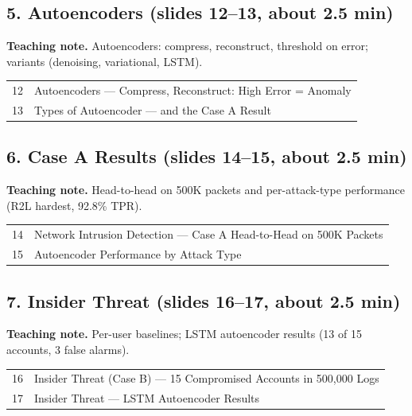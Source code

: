 \documentclass[11pt]{article}
\begin{document}
\subsection{5. Autoencoders \normalfont\small\color{GreyN}(slides 12--13, about 2.5 min)}

\textbf{Teaching note.} Autoencoders: compress, reconstruct, threshold on error; variants (denoising, variational, LSTM).

\begin{center}\small\renewcommand{\arraystretch}{1.1}\begin{tabularx}{\textwidth}{@{}r X@{}}12 & Autoencoders --- Compress, Reconstruct: High Error = Anomaly\\
13 & Types of Autoencoder --- and the Case A Result\\\end{tabularx}\end{center}

\subsection{6. Case A Results \normalfont\small\color{GreyN}(slides 14--15, about 2.5 min)}

\textbf{Teaching note.} Head-to-head on 500K packets and per-attack-type performance (R2L hardest, 92.8\% TPR).

\begin{center}\small\renewcommand{\arraystretch}{1.1}\begin{tabularx}{\textwidth}{@{}r X@{}}14 & Network Intrusion Detection --- Case A Head-to-Head on 500K Packets\\
15 & Autoencoder Performance by Attack Type\\\end{tabularx}\end{center}

\subsection{7. Insider Threat \normalfont\small\color{GreyN}(slides 16--17, about 2.5 min)}

\textbf{Teaching note.} Per-user baselines; LSTM autoencoder results (13 of 15 accounts, 3 false alarms).

\begin{center}\small\renewcommand{\arraystretch}{1.1}\begin{tabularx}{\textwidth}{@{}r X@{}}16 & Insider Threat (Case B) --- 15 Compromised Accounts in 500,000 Logs\\
17 & Insider Threat --- LSTM Autoencoder Results\\\end{tabularx}\end{center}
\end{document}
